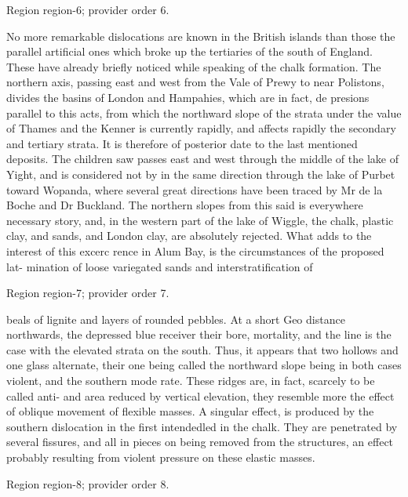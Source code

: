\documentclass[11pt]{article}
\begin{document}
{\scriptsize\color{gray} Region region-6; provider order 6.\par}
\medskip

No more remarkable dislocations are known in the British islands than those the parallel artificial ones which broke up the tertiaries of the south of England. These have already briefly noticed while speaking of the chalk formation. The northern axis, passing east and west from the Vale of Prewy to near Polistons, divides the basins of London and Hampahies, which are in fact, de presions parallel to this acts, from which the northward slope of the strata under the value of Thames and the Kenner is currently rapidly, and affects rapidly the secondary and tertiary strata. It is therefore of posterior date to the last mentioned deposits. The children saw passes east and west through the middle of the lake of Yight, and is considered not by in the same direction through the lake of Purbet toward Wopanda, where several great directions have been traced by Mr de la Boche and Dr Buckland. The northern slopes from this said is everywhere necessary story, and, in the western part of the lake of Wiggle, the chalk, plastic clay, and sands, and London clay, are absolutely rejected. What adds to the interest of this excerc rence in Alum Bay, is the circumstances of the proposed lat- mination of loose variegated sands and interstratification of
\par

{\scriptsize\color{gray} Region region-7; provider order 7.\par}
\medskip

beals of lignite and layers of rounded pebbles. At a short Geo distance northwards, the depressed blue receiver their bore, mortality, and the line is the case with the elevated strata on the south. Thus, it appears that two hollows and one glass alternate, their one being called the northward slope being in both cases violent, and the southern mode rate. These ridges are, in fact, scarcely to be called anti- and area reduced by vertical elevation, they resemble more the effect of oblique movement of flexible masses. A singular effect, is produced by the southern dislocation in the first intendedled in the chalk. They are penetrated by several fissures, and all in pieces on being removed from the structures, an effect probably resulting from violent pressure on these elastic masses.
\par

{\scriptsize\color{gray} Region region-8; provider order 8.\par}
\medskip
\end{document}
